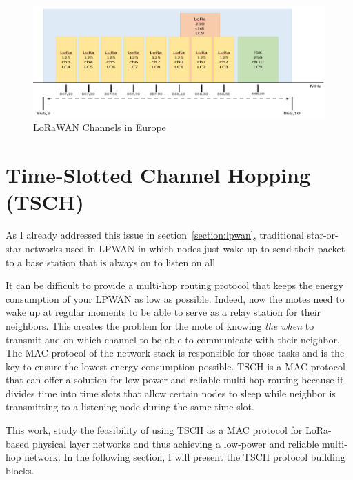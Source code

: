 \begin{figure}[H]
  \centering
  \includegraphics[width=\textwidth]{thesis.tex/chapters/context/fig/channels.png}
  \caption{LoRaWAN Channels in Europe\cite{Polonelli_2019}\label{fig:channels}}
\end{figure}


\section{Time-Slotted Channel Hopping (TSCH)}

As I already addressed this issue in section~\ref{section:lpwan},
traditional star-or-star networks used in LPWAN in which nodes just wake up
to send their packet to a base station that is always on to listen on all

It can be difficult to provide a multi-hop routing protocol that keeps the energy
consumption of your LPWAN as low as possible.
Indeed, now the motes need to wake up at regular moments to be able to serve
as a relay station for their neighbors.
This creates the problem for the mote of knowing \emph{the when} to transmit
and on which channel to be able to communicate with their neighbor.
The MAC protocol of the network stack is responsible for those tasks and
is the key to ensure the lowest energy consumption possible.
TSCH is a MAC protocol that can offer a solution for low power and reliable multi-hop routing
because it divides time into time slots that allow certain nodes to sleep while
neighbor is transmitting to a listening node during the same time-slot.

This work, study the feasibility of using TSCH as a MAC protocol for
LoRa-based physical layer networks and thus achieving a low-power and reliable
multi-hop network.
In the following section, I will present the TSCH protocol building blocks.

\paragraph{}

